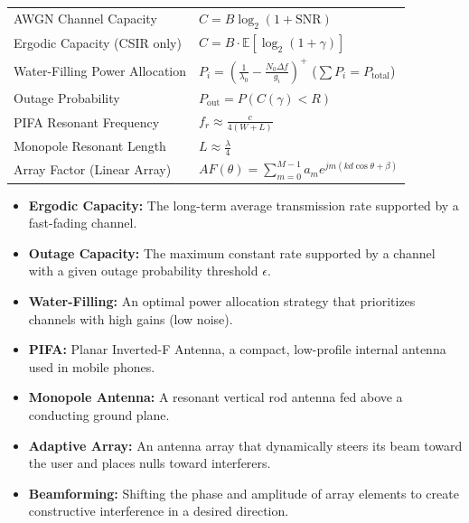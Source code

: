 \documentclass[12pt,a4paper]{article}
\renewcommand{\arraystretch}{1.45}
\begin{document}
\begin{tcolorbox}[formulabox, title={\textbf{Key Formulas at a Glance}}]
\renewcommand{\arraystretch}{1.3}
\begin{tabularx}{\linewidth}{B{5.5cm} X}AWGN Channel Capacity & $C = B \log_2(1 + \text{SNR})$ \\
Ergodic Capacity (CSIR only) & $C = B \cdot \mathbb{E}\left[ \log_2(1 + \gamma) \right]$ \\
Water-Filling Power Allocation & $P_i = \left( \frac{1}{\lambda_0} - \frac{N_0 \Delta f}{g_i} \right)^{\!+}$ \quad ($\sum P_i = P_{\text{total}}$) \\
Outage Probability & $P_{\text{out}} = P(C(\gamma) < R)$ \\
PIFA Resonant Frequency & $f_r \approx \frac{c}{4(W + L)}$ \\
Monopole Resonant Length & $L \approx \frac{\lambda}{4}$ \\
Array Factor (Linear Array) & $AF(\theta) = \sum_{m=0}^{M-1} a_m e^{j m (k d \cos\theta + \beta)}$
\end{tabularx}
\end{tcolorbox}

\begin{tcolorbox}[defbox, title={\textbf{One-Line Definitions}}]
\begin{itemize}[leftmargin=*, itemsep=2.5pt, topsep=0pt]
  \item \textbf{Ergodic Capacity:} The long-term average transmission rate supported by a fast-fading channel.
  \item \textbf{Outage Capacity:} The maximum constant rate supported by a channel with a given outage probability threshold $\epsilon$.
  \item \textbf{Water-Filling:} An optimal power allocation strategy that prioritizes channels with high gains (low noise).
  \item \textbf{PIFA:} Planar Inverted-F Antenna, a compact, low-profile internal antenna used in mobile phones.
  \item \textbf{Monopole Antenna:} A resonant vertical rod antenna fed above a conducting ground plane.
  \item \textbf{Adaptive Array:} An antenna array that dynamically steers its beam toward the user and places nulls toward interferers.
  \item \textbf{Beamforming:} Shifting the phase and amplitude of array elements to create constructive interference in a desired direction.
\end{itemize}
\end{tcolorbox}
\end{document}
